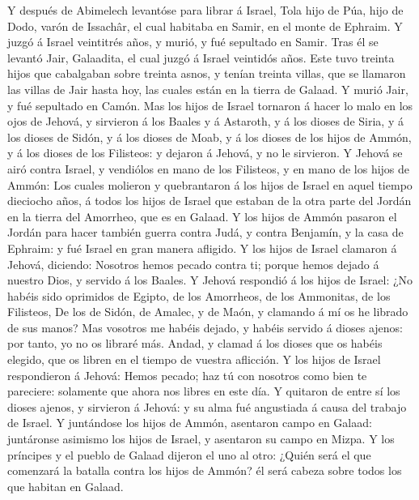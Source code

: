 Y después de Abimelech levantóse para librar á Israel,
Tola hijo de Púa, hijo de Dodo, varón de Issachâr, el cual habitaba en
Samir, en el monte de Ephraim.  Y juzgó á Israel
veintitrés años, y murió, y fué sepultado en Samir.  Tras
él se levantó Jair, Galaadita, el cual juzgó á Israel veintidós años.
 Este tuvo treinta hijos que cabalgaban sobre treinta
asnos, y tenían treinta villas, que se llamaron las villas de Jair hasta
hoy, las cuales están en la tierra de Galaad.  Y murió
Jair, y fué sepultado en Camón.  Mas los hijos de Israel
tornaron á hacer lo malo en los ojos de Jehová, y sirvieron á los Baales
y á Astaroth, y á los dioses de Siria, y á los dioses de Sidón, y á los
dioses de Moab, y á los dioses de los hijos de Ammón, y á los dioses de
los Filisteos: y dejaron á Jehová, y no le sirvieron.  Y
Jehová se airó contra Israel, y vendiólos en mano de los Filisteos, y en
mano de los hijos de Ammón:  Los cuales molieron y
quebrantaron á los hijos de Israel en aquel tiempo dieciocho años, á
todos los hijos de Israel que estaban de la otra parte del Jordán en la
tierra del Amorrheo, que es en Galaad.  Y los hijos de
Ammón pasaron el Jordán para hacer también guerra contra Judá, y contra
Benjamín, y la casa de Ephraim: y fué Israel en gran manera afligido.
 Y los hijos de Israel clamaron á Jehová, diciendo:
Nosotros hemos pecado contra ti; porque hemos dejado á nuestro Dios, y
servido á los Baales.  Y Jehová respondió á los hijos de
Israel: ¿No habéis sido oprimidos de Egipto, de los Amorrheos, de los
Ammonitas, de los Filisteos,  De los de Sidón, de Amalec,
y de Maón, y clamando á mí os he librado de sus manos? 
Mas vosotros me habéis dejado, y habéis servido á dioses ajenos: por
tanto, yo no os libraré más.  Andad, y clamad á los
dioses que os habéis elegido, que os libren en el tiempo de vuestra
aflicción.  Y los hijos de Israel respondieron á Jehová:
Hemos pecado; haz tú con nosotros como bien te pareciere: solamente que
ahora nos libres en este día.  Y quitaron de entre sí los
dioses ajenos, y sirvieron á Jehová: y su alma fué angustiada á causa
del trabajo de Israel.  Y juntándose los hijos de Ammón,
asentaron campo en Galaad: juntáronse asimismo los hijos de Israel, y
asentaron su campo en Mizpa.  Y los príncipes y el pueblo
de Galaad dijeron el uno al otro: ¿Quién será el que comenzará la
batalla contra los hijos de Ammón? él será cabeza sobre todos los que
habitan en Galaad.

